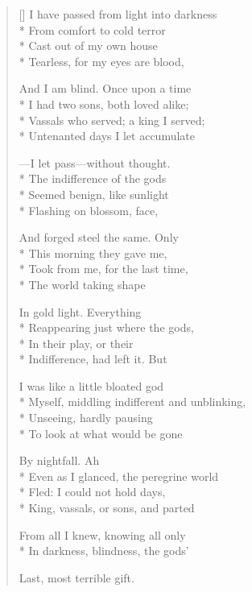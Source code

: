 \label{ch:lear_ax}
\settowidth{\versewidth}{Myself, middling indifferent and unblinking,}
\begin{verse}[\versewidth]
I have passed from light into darkness\\*
From comfort to cold terror\\*
Cast out of my own house\\*
Tearless, for my eyes are blood,

And I am blind.  Once upon a time\\*
I had two sons, both loved alike;\\*
Vassals who served; a king I served;\\*
Untenanted days I let accumulate

---I let pass---without thought.\\*
The indifference of the gods\\*
Seemed benign, like sunlight\\*
Flashing on blossom, face,

And forged steel the same.  Only\\*
This morning they gave me,\\*
Took from me, for the last time,\\*
The world taking shape

In gold light.  Everything\\*
Reappearing just where the gods,\\*
In their play, or their\\*
Indifference, had left it.  But

I was like a little bloated god\\*
Myself, middling indifferent and unblinking,\\*
Unseeing, hardly pausing\\*
To look at what would be gone

By nightfall.    Ah\\*
Even as I glanced, the peregrine world\\*
Fled: I could not hold days,\\*
King, vassals, or sons, and parted

From all I knew, knowing all only\\*
In darkness, blindness, the gods'

Last, most terrible gift.
\end{verse}
